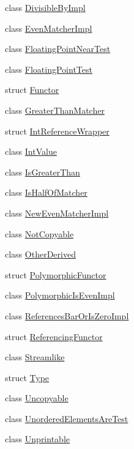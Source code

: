 \begin{DoxyCompactItemize}
\item 
class \hyperlink{classtesting_1_1gmock__matchers__test_1_1DivisibleByImpl}{Divisible\+By\+Impl}
\item 
class \hyperlink{classtesting_1_1gmock__matchers__test_1_1EvenMatcherImpl}{Even\+Matcher\+Impl}
\item 
class \hyperlink{classtesting_1_1gmock__matchers__test_1_1FloatingPointNearTest}{Floating\+Point\+Near\+Test}
\item 
class \hyperlink{classtesting_1_1gmock__matchers__test_1_1FloatingPointTest}{Floating\+Point\+Test}
\item 
struct \hyperlink{structtesting_1_1gmock__matchers__test_1_1Functor}{Functor}
\item 
class \hyperlink{classtesting_1_1gmock__matchers__test_1_1GreaterThanMatcher}{Greater\+Than\+Matcher}
\item 
struct \hyperlink{structtesting_1_1gmock__matchers__test_1_1IntReferenceWrapper}{Int\+Reference\+Wrapper}
\item 
class \hyperlink{classtesting_1_1gmock__matchers__test_1_1IntValue}{Int\+Value}
\item 
class \hyperlink{classtesting_1_1gmock__matchers__test_1_1IsGreaterThan}{Is\+Greater\+Than}
\item 
class \hyperlink{classtesting_1_1gmock__matchers__test_1_1IsHalfOfMatcher}{Is\+Half\+Of\+Matcher}
\item 
class \hyperlink{classtesting_1_1gmock__matchers__test_1_1NewEvenMatcherImpl}{New\+Even\+Matcher\+Impl}
\item 
class \hyperlink{classtesting_1_1gmock__matchers__test_1_1NotCopyable}{Not\+Copyable}
\item 
class \hyperlink{classtesting_1_1gmock__matchers__test_1_1OtherDerived}{Other\+Derived}
\item 
struct \hyperlink{structtesting_1_1gmock__matchers__test_1_1PolymorphicFunctor}{Polymorphic\+Functor}
\item 
class \hyperlink{classtesting_1_1gmock__matchers__test_1_1PolymorphicIsEvenImpl}{Polymorphic\+Is\+Even\+Impl}
\item 
class \hyperlink{classtesting_1_1gmock__matchers__test_1_1ReferencesBarOrIsZeroImpl}{References\+Bar\+Or\+Is\+Zero\+Impl}
\item 
struct \hyperlink{structtesting_1_1gmock__matchers__test_1_1ReferencingFunctor}{Referencing\+Functor}
\item 
class \hyperlink{classtesting_1_1gmock__matchers__test_1_1Streamlike}{Streamlike}
\item 
struct \hyperlink{structtesting_1_1gmock__matchers__test_1_1Type}{Type}
\item 
class \hyperlink{classtesting_1_1gmock__matchers__test_1_1Uncopyable}{Uncopyable}
\item 
class \hyperlink{classtesting_1_1gmock__matchers__test_1_1UnorderedElementsAreTest}{Unordered\+Elements\+Are\+Test}
\item 
class \hyperlink{classtesting_1_1gmock__matchers__test_1_1Unprintable}{Unprintable}
\end{DoxyCompactItemize}
